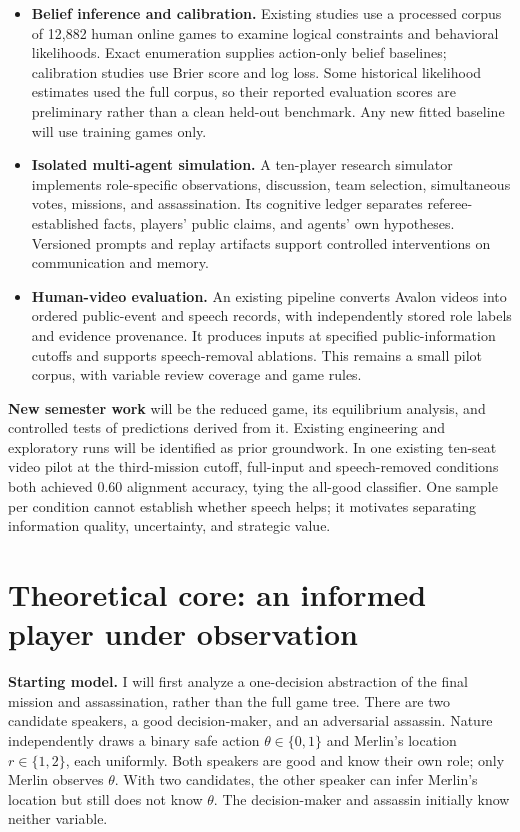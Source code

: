 \documentclass[11pt,letterpaper]{article}
\begin{document}
\begin{itemize}
\item \textbf{Belief inference and calibration.} Existing studies use a processed corpus of 12,882 human online games to examine logical constraints and behavioral likelihoods. Exact enumeration supplies action-only belief baselines; calibration studies use Brier score and log loss. Some historical likelihood estimates used the full corpus, so their reported evaluation scores are preliminary rather than a clean held-out benchmark. Any new fitted baseline will use training games only.
\item \textbf{Isolated multi-agent simulation.} A ten-player research simulator implements role-specific observations, discussion, team selection, simultaneous votes, missions, and assassination. Its cognitive ledger separates referee-established facts, players' public claims, and agents' own hypotheses. Versioned prompts and replay artifacts support controlled interventions on communication and memory.
\item \textbf{Human-video evaluation.} An existing pipeline converts Avalon videos into ordered public-event and speech records, with independently stored role labels and evidence provenance. It produces inputs at specified public-information cutoffs and supports speech-removal ablations. This remains a small pilot corpus, with variable review coverage and game rules.
\end{itemize}

\textbf{New semester work} will be the reduced game, its equilibrium analysis, and controlled tests of predictions derived from it. Existing engineering and exploratory runs will be identified as prior groundwork. In one existing ten-seat video pilot at the third-mission cutoff, full-input and speech-removed conditions both achieved 0.60 alignment accuracy, tying the all-good classifier. One sample per condition cannot establish whether speech helps; it motivates separating information quality, uncertainty, and strategic value.

\section{Theoretical core: an informed player under observation}
\textbf{Starting model.} I will first analyze a one-decision abstraction of the final mission and assassination, rather than the full game tree. There are two candidate speakers, a good decision-maker, and an adversarial assassin. Nature independently draws a binary safe action $\theta\in\{0,1\}$ and Merlin's location $r\in\{1,2\}$, each uniformly. Both speakers are good and know their own role; only Merlin observes $\theta$. With two candidates, the other speaker can infer Merlin's location but still does not know $\theta$. The decision-maker and assassin initially know neither variable.
\end{document}
